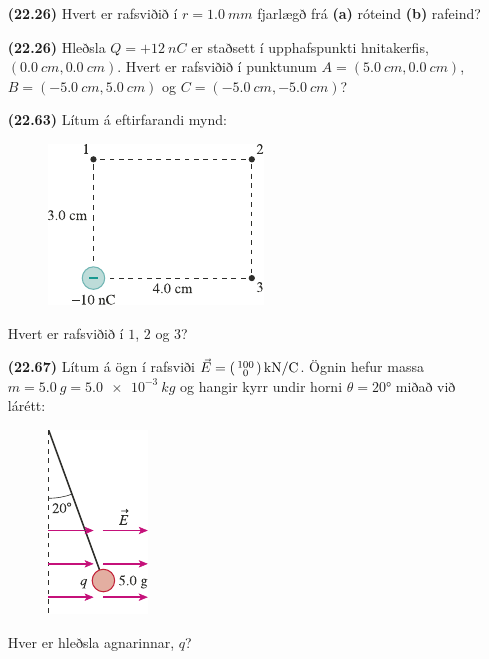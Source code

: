 \ifdefined \wholebook \else\documentclass[oneside]{book}\usepackage{EdlBook}\graphicspath{{figures/}}
\begin{document}
\begin{enumerate}[label = \textbf{(\alph*)}]

\item[\textbf{(22.26)}] Hvert er rafsviðið í $r = \SI{1.0}{mm}$ fjarlægð frá \textbf{(a)} róteind \textbf{(b)} rafeind?

\item[\textbf{(22.26)}] Hleðsla $Q = +\SI{12}{nC}$ er staðsett í upphafspunkti hnitakerfis, $(\SI{0.0}{cm}, \SI{0.0}{cm})$. Hvert er rafsviðið í punktunum $A = (\SI{5.0}{cm}, \SI{0.0}{cm})$, $B = (\SI{-5.0}{cm}, \SI{5.0}{cm})$ og $C = (\SI{-5.0}{cm}, \SI{-5.0}{cm})$?

\item[\textbf{(22.63)}] Lítum á eftirfarandi mynd:

\begin{figure}[H]
    \centering
    \includegraphics{figures/rk2263.pdf}
\end{figure}
Hvert er rafsviðið í $1$, $2$ og $3$?

\item[\textbf{(22.67)}] Lítum á ögn í rafsviði $\vec{E} = \smqty(100 \\ 0) \, \si{kN/C}$. Ögnin hefur massa $m = \SI{5.0}{g} = \SI{5.0e-3}{kg}$ og hangir kyrr undir horni $\theta = \ang{20}$ miðað við lárétt:
\begin{figure}[H]
    \centering
    \includegraphics{figures/rk2267.pdf}
\end{figure}
Hver er hleðsla agnarinnar, $q$?

\end{enumerate}
\end{document}
